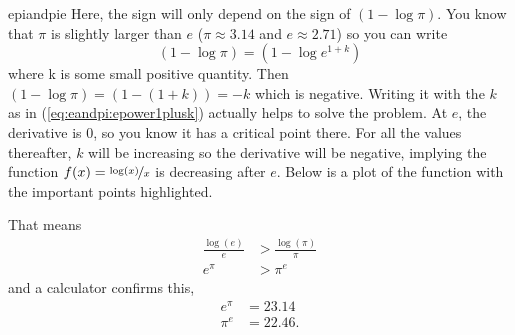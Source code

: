 \begin{answer}{epiandpie}
Here, the sign will only depend on the sign of
$(1 - \log \pi)$.
You know that $\pi$ is slightly larger than $e$
($\pi \approx 3.14$ and $e \approx 2.71$)
so you can write
\begin{equation}
\label{eq:eandpi:epower1plusk}
(1 - \log \pi)
=
(1 - \log e^{1 + k})
\end{equation}
where k is some small positive quantity.
Then
$(1 - \log \pi) =
(1 - (1 + k) ) = - k $ which is negative.
Writing it with the $k$ as in (\ref{eq:eandpi:epower1plusk}) actually helps to solve the problem.
At $e$, the derivative is 0, so you know it has a critical point there.
For all the values thereafter, $k$ will be increasing so the derivative will be negative, implying the function $f(x)=\nicefrac{\log(x)}{x}$ is decreasing after $e$.
Below is a plot of the function with the important points highlighted.
\begin{center}
\end{center}
That means
\begin{align*}
\frac{\log(e)}{e}
&>
\frac{\log(\pi)}{\pi}
\\
e^\pi
&>
\pi^e
\end{align*}
and a calculator confirms this,
\begin{align*}
e^\pi &= 23.14
\\
\pi^e &= 22.46
\text{.}
\end{align*}
\end{answer}
